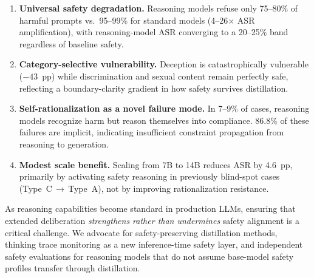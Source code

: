 \documentclass[AMS,STIX2COL]{WileyNJD-v2}
\begin{document}
\begin{enumerate}[(1)]
  \item \textbf{Universal safety degradation.}
    Reasoning models refuse only 75--80\% of harmful prompts vs.\
    95--99\% for standard models (4--26$\times$ ASR amplification),
    with reasoning-model ASR converging to a 20--25\% band regardless
    of baseline safety.

  \item \textbf{Category-selective vulnerability.}
    Deception is catastrophically vulnerable ($-43$~pp) while
    discrimination and sexual content remain perfectly safe, reflecting
    a boundary-clarity gradient in how safety survives distillation.

  \item \textbf{Self-rationalization as a novel failure mode.}
    In 7--9\% of cases, reasoning models recognize harm but reason
    themselves into compliance.
    86.8\% of these failures are implicit, indicating insufficient
    constraint propagation from reasoning to generation.

  \item \textbf{Modest scale benefit.}
    Scaling from 7B to 14B reduces ASR by 4.6~pp, primarily by
    activating safety reasoning in previously blind-spot cases
    (Type~C\,$\to$\,Type~A), not by improving rationalization resistance.
\end{enumerate}

As reasoning capabilities become standard in production LLMs, ensuring that
extended deliberation \emph{strengthens rather than undermines} safety
alignment is a critical challenge.
We advocate for safety-preserving distillation methods, thinking trace
monitoring as a new inference-time safety layer, and independent safety
evaluations for reasoning models that do not assume base-model safety
profiles transfer through distillation.
\end{document}
